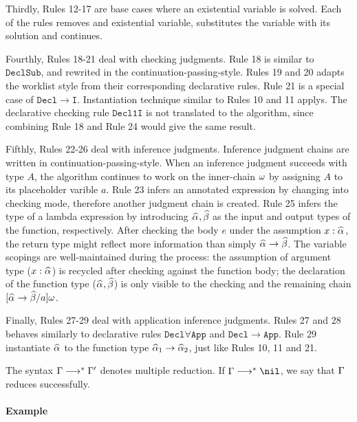 Thirdly, Rules 12-17 are base cases where an existential variable is solved.
Each of the rules removes and existential variable, substitutes the variable with its solution and continues.

Fourthly, Rules 18-21 deal with checking judgments.
Rule 18 is similar to $\mathtt{DeclSub}$, and rewrited in the continuation-passing-style.
Rules 19 and 20 adapts the worklist style from their corresponding declarative rules.
Rule 21 is a special case of $\mathtt{Decl\to I}$.
Instantiation technique similar to Rules 10 and 11 applys.
The declarative checking rule $\mathtt{Decl1I}$ is not translated to the algorithm,
since combining Rule 18 and Rule 24 would give the same result.

Fifthly, Rules 22-26 deal with inference judgments.
Inference judgment chains are written in continuation-passing-style.
When an inference judgment succeeds with type $A$,
the algorithm continues to work on the inner-chain $\omega$ by assigning $A$ to its placeholder varible $a$.
Rule 23 infers an annotated expression by changing into checking mode,
therefore another judgment chain is created.
Rule 25 infers the type of a lambda expression by introducing $\al, \bt$
as the input and output types of the function, respectively.
After checking the body $e$ under the assumption $x:\al$,
the return type might reflect more information than simply $\al \to \bt$.
The variable scopings are well-maintained during the process:
the assumption of argument type ($x:\al$) is recycled after checking against the function body;
the declaration of the function type ($\al,\bt$) is only visible to
the checking and the remaining chain $[\al\to\bt/a]\jg$.

Finally, Rules 27-29 deal with application inference judgments.
Rules 27 and 28 behaves similarly to declarative rules $\mathtt{Decl\forall App}$ and $\mathtt{Decl\to App}$.
Rule 29 instantiate $\al$ to the function type $\al[1] \to \al[2]$, just like Rules 10, 11 and 21.

The syntax $\Gamma\longrightarrow^* \Gamma'$ denotes multiple reduction.
If $\Gm\redto\nil$, we say that $\Gamma$ reduces successfully.

\paragraph{Example}

